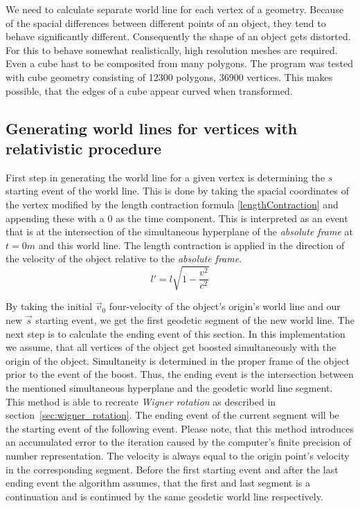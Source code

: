 \documentclass{egpubl}
\begin{document}
We need to calculate separate world line for each vertex of a geometry. Because of the spacial differences between different points of an object, they tend to behave significantly different. Consequently the shape of an object gets distorted. For this to behave somewhat realistically, high resolution meshes are required. Even a cube hast to be composited from many polygons. The program was tested with cube geometry consisting of 12300 polygons, 36900 vertices. This makes possible, that the edges of a cube appear curved when transformed.

\subsection{Generating world lines for vertices with relativistic procedure}
\label{sec:genRelProc}
First step in generating the world line for a given vertex is determining the $s$ starting event of the world line. This is done by taking the spacial coordinates of the vertex modified by the length contraction formula \ref{lengthContraction} and appending these with a $0$ as the time component. This is interpreted as an event that is at the intersection of the simultaneous hyperplane of the \emph{absolute frame} at $t = 0 m$ and this world line. The length contraction is applied in the direction of the velocity of the object relative to the \emph{absolute frame}.
\begin{equation}
\label{lengthContraction}
l' =l\sqrt{1 - \frac{v^2}{c^2}}
\end{equation}

By taking the initial $\vec{v}_0$ four-velocity of the object's origin's world line and our new $\vec{s}$ starting event, we get the first geodetic segment of the new world line. The next step is to calculate the ending event of this section. In this implementation we assume, that all vertices of the object get boosted simultaneously with the origin of the object. Simultaneity is determined in the proper frame of the object prior to the event of the boost. Thus, the ending event is the intersection between the mentioned simultaneous hyperplane and the geodetic world line segment. This method is able to recreate \emph{Wigner rotation} as described in section~\ref{sec:wigner_rotation}. The ending event of the current segment will be the starting event of the following event. Please note, that this method introduces an accumulated error to the iteration caused by the computer's finite precision of number representation. The velocity is always equal to the origin point's velocity in the corresponding segment. Before the first starting event and after the last ending event the algorithm assumes, that the first  and last segment is a continuation and is continued by the same geodetic world line respectively.
\end{document}
